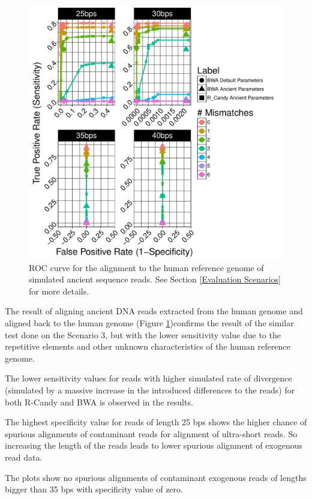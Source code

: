 \documentclass[11pt,a4paper]{report}
\begin{document}
\begin{figure}[H]
\centering
\includegraphics[width=12cm]{pictures/f_DS4_emp.pdf}

\caption{
ROC curve for the alignment to the human reference genome of simulated ancient
sequence reads. See Section \ref{Evaluation Scenarios} for more details.
}

\label{DS4_emp}
\end{figure}



The result of aligning ancient DNA reads extracted from the human genome and 
aligned back to the human genome (Figure \ref{DS4_emp})confirms the result of 
the similar test done on the Scenario 3, but with the lower sensitivity value 
due to the repetitive elements and other unknown characteristics of the human 
reference genome.

The lower sensitivity values for reads with higher simulated rate of divergence 
(simulated by a massive increase in the introduced differences to the reads) for
both R-Candy and BWA is observed in the results.

The highest specificity value for reads of length 25 bps shows the higher chance
of spurious alignments of contaminant reads for alignment of ultra-short reads.
So increasing the length of the reads leads to lower spurious alignment of 
exogenous read data.

The plots show no spurious alignments of contaminant exogenous reads of lengths 
bigger than 35 bps with specificity value of zero.
\end{document}
